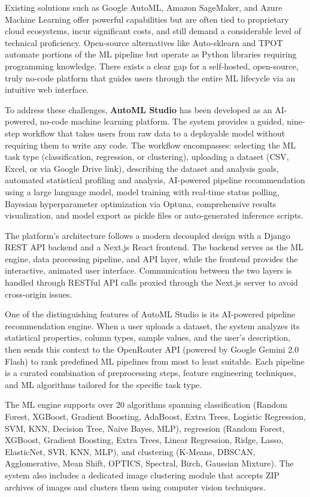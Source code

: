 \documentclass[12pt,a4paper]{report}
\begin{document}
Existing solutions such as Google AutoML, Amazon SageMaker, and Azure Machine Learning offer powerful capabilities but are often tied to proprietary cloud ecosystems, incur significant costs, and still demand a considerable level of technical proficiency. Open-source alternatives like Auto-sklearn and TPOT automate portions of the ML pipeline but operate as Python libraries requiring programming knowledge. There exists a clear gap for a self-hosted, open-source, truly no-code platform that guides users through the entire ML lifecycle via an intuitive web interface.

To address these challenges, \textbf{AutoML Studio} has been developed as an AI-powered, no-code machine learning platform. The system provides a guided, nine-step workflow that takes users from raw data to a deployable model without requiring them to write any code. The workflow encompasses: selecting the ML task type (classification, regression, or clustering), uploading a dataset (CSV, Excel, or via Google Drive link), describing the dataset and analysis goals, automated statistical profiling and analysis, AI-powered pipeline recommendation using a large language model, model training with real-time status polling, Bayesian hyperparameter optimization via Optuna, comprehensive results visualization, and model export as pickle files or auto-generated inference scripts.

The platform's architecture follows a modern decoupled design with a Django REST API backend and a Next.js React frontend. The backend serves as the ML engine, data processing pipeline, and API layer, while the frontend provides the interactive, animated user interface. Communication between the two layers is handled through RESTful API calls proxied through the Next.js server to avoid cross-origin issues.

One of the distinguishing features of AutoML Studio is its AI-powered pipeline recommendation engine. When a user uploads a dataset, the system analyzes its statistical properties, column types, sample values, and the user's description, then sends this context to the OpenRouter API (powered by Google Gemini 2.0 Flash) to rank predefined ML pipelines from most to least suitable. Each pipeline is a curated combination of preprocessing steps, feature engineering techniques, and ML algorithms tailored for the specific task type.

The ML engine supports over 20 algorithms spanning classification (Random Forest, XGBoost, Gradient Boosting, AdaBoost, Extra Trees, Logistic Regression, SVM, KNN, Decision Tree, Naive Bayes, MLP), regression (Random Forest, XGBoost, Gradient Boosting, Extra Trees, Linear Regression, Ridge, Lasso, ElasticNet, SVR, KNN, MLP), and clustering (K-Means, DBSCAN, Agglomerative, Mean Shift, OPTICS, Spectral, Birch, Gaussian Mixture). The system also includes a dedicated image clustering module that accepts ZIP archives of images and clusters them using computer vision techniques.
\end{document}
